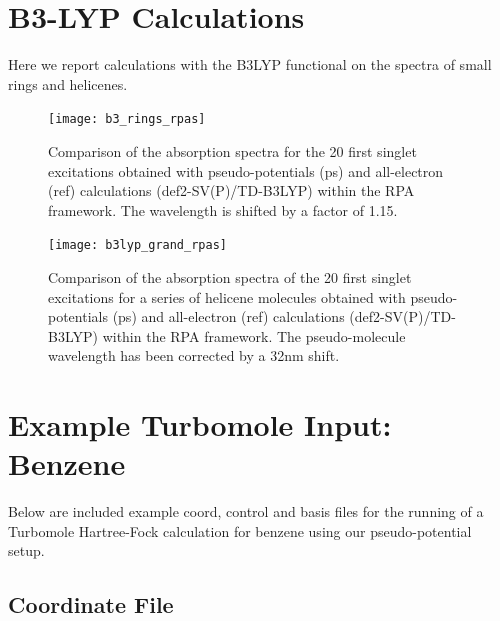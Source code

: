 \documentclass[aip]{revtex4-1}
\begin{document}
\section*{B3-LYP Calculations}

Here we report calculations with the B3LYP functional on the spectra of small rings and helicenes.

\begin{figure}[b]
\begin{center}
\texttt{[image: b3\_rings\_rpas]}
\end{center}
\hspace*{3in}
\caption{Comparison of the absorption spectra for the 20 first singlet excitations obtained with
pseudo-potentials (ps) and all-electron (ref) calculations (def2-SV(P)/TD-B3LYP) within the RPA
framework. The wavelength is shifted by a factor of 1.15.}
\label{fig:cnhn_uv_rpas_b3lyp}
\end{figure}

\begin{figure}
\begin{center}
\texttt{[image: b3lyp\_grand\_rpas]}
\end{center}
\vspace{0.25in}
\hspace*{3in}
\caption{Comparison of the absorption spectra of the 20 first singlet excitations for a series of helicene molecules obtained with pseudo-potentials (ps) and all-electron (ref) calculations (def2-SV(P)/TD-B3LYP) within the RPA
framework. The pseudo-molecule wavelength has been corrected by a 32nm shift.}
\label{fig:helicene_spectra_b3lyp}
\end{figure}

\section*{Example Turbomole Input: Benzene}

Below are included example coord, control and basis files for the running of a Turbomole Hartree-Fock calculation for benzene using our pseudo-potential setup.

\subsection*{Coordinate File}
\end{document}
